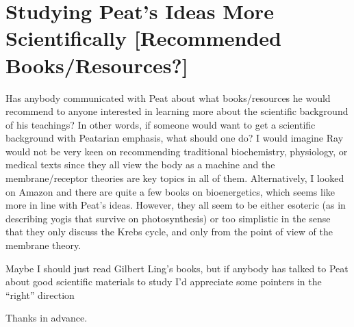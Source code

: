 \chapter{Studying Peat's Ideas More Scientifically [Recommended Books/Resources?]}

\begin{refsection}

Has anybody communicated with Peat about what books/resources he would recommend to anyone interested in learning more about the scientific background of his teachings? In other words, if someone would want to get a scientific background with Peatarian emphasis, what should one do? I would imagine Ray would not be very keen on recommending traditional biochemistry, physiology, or medical texts since they all view the body as a machine and the membrane/receptor theories are key topics in all of them. Alternatively, I looked on Amazon and there are quite a few books on bioenergetics, which seems like more in line with Peat's ideas. However, they all seem to be either esoteric (as in describing yogis that survive on photosynthesis) or too simplistic in the sense that they only discuss the Krebs cycle, and only from the point of view of the membrane theory.

Maybe I should just read Gilbert Ling's books, but if anybody has talked to Peat about good scientific materials to study I'd appreciate some pointers in the \enquote{right} direction

Thanks in advance.

\printbibliography[heading=subbibliography]

\end{refsection}
